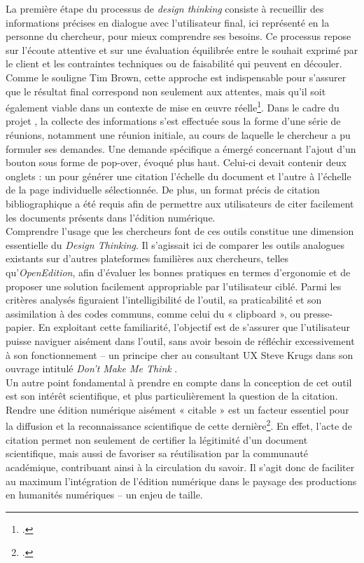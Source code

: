 La première étape du processus de \textit{design thinking} consiste à recueillir des informations précises en dialogue avec l’utilisateur final, ici représenté en la personne du chercheur, pour mieux comprendre ses besoins. Ce processus repose sur l’écoute attentive et sur une évaluation équilibrée entre le souhait exprimé par le client et les contraintes techniques ou de faisabilité qui peuvent en découler. Comme le souligne Tim Brown, cette approche est indispensable pour s’assurer que le résultat final correspond non seulement aux attentes, mais qu’il soit également viable dans un contexte de mise en œuvre réelle\footcite{brown_design_2008}.
Dans le cadre du projet \pense, la collecte des informations s’est effectuée sous la forme d’une série de réunions, notamment une réunion initiale, au cours de laquelle le chercheur a pu formuler ses demandes. Une demande spécifique a émergé concernant l’ajout d’un bouton sous forme de pop-over, évoqué plus haut. Celui-ci devait contenir deux onglets : un pour générer une citation l’échelle du document et l’autre à l’échelle de la page individuelle sélectionnée. De plus, un format précis de citation bibliographique a été requis afin de permettre aux utilisateurs de citer facilement les documents présents dans l’édition numérique.
\newline
{}\\

Comprendre l’usage que les chercheurs font de ces outils constitue une dimension essentielle du \textit{Design Thinking}. Il s’agissait ici de comparer les outils analogues existants sur d’autres plateformes familières aux chercheurs, telles qu’\textit{OpenEdition}, afin d’évaluer les bonnes pratiques en termes d’ergonomie et de proposer une solution facilement appropriable par l’utilisateur ciblé. Parmi les critères analysés figuraient l’intelligibilité de l’outil, sa praticabilité et son assimilation à des codes communs, comme celui du « clipboard », ou presse-papier. En exploitant cette familiarité, l’objectif est de s’assurer que l’utilisateur puisse naviguer aisément dans l’outil, sans avoir besoin de réfléchir excessivement à son fonctionnement – un principe cher au consultant UX Steve Krugs dans son ouvrage intitulé \textit{Don't Make Me Think }.
\newline
{}\\

Un autre point fondamental à prendre en compte dans la conception de cet outil est son intérêt scientifique, et plus particulièrement la question de la citation. Rendre une édition numérique aisément « citable » est un facteur essentiel pour la diffusion et la reconnaissance scientifique de cette dernière\footcite{sahle_what_2016}. En effet, l’acte de citation permet non seulement de certifier la légitimité d’un document scientifique, mais aussi de favoriser sa réutilisation par la communauté académique, contribuant ainsi à la circulation du savoir. Il s’agit donc de faciliter au maximum l’intégration de l’édition numérique dans le paysage des productions en humanités numériques – un enjeu de taille.
\newline
{}\\

